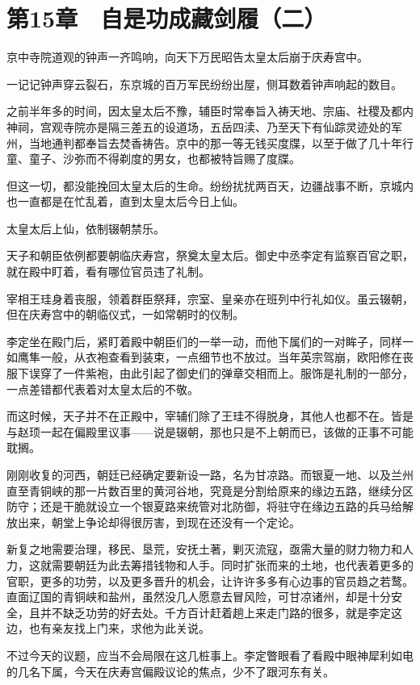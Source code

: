 \section{第15章　自是功成藏剑履（二）}

京中寺院道观的钟声一齐鸣响，向天下万民昭告太皇太后崩于庆寿宫中。

一记记钟声穿云裂石，东京城的百万军民纷纷出屋，侧耳数着钟声响起的数目。

之前半年多的时间，因太皇太后不豫，辅臣时常奉旨入祷天地、宗庙、社稷及都内神祠，宫观寺院亦是隔三差五的设道场，五岳四渎、乃至天下有仙踪灵迹处的军州，当地通判都奉旨去焚香祷告。京中的那一等无钱买度牒，以至于做了几十年行童、童子、沙弥而不得剃度的男女，也都被特旨赐了度牒。

但这一切，都没能挽回太皇太后的生命。纷纷扰扰两百天，边疆战事不断，京城内也一直都是在忙乱着，直到太皇太后今日上仙。

太皇太后上仙，依制辍朝禁乐。

天子和朝臣依例都要朝临庆寿宫，祭奠太皇太后。御史中丞李定有监察百官之职，就在殿中盯着，看有哪位官员违了礼制。

宰相王珪身着丧服，领着群臣祭拜，宗室、皇亲亦在班列中行礼如仪。虽云辍朝，但在庆寿宫中的朝临仪式，一如常朝时的仪制。

李定坐在殿门后，紧盯着殿中朝臣们的一举一动，而他下属们的一对眸子，同样一如鹰隼一般，从衣袍查看到装束，一点细节也不放过。当年英宗驾崩，欧阳修在丧服下误穿了一件紫袍，由此引起了御史们的弹章交相而上。服饰是礼制的一部分，一点差错都代表着对太皇太后的不敬。

而这时候，天子并不在正殿中，宰辅们除了王珪不得脱身，其他人也都不在。皆是与赵顼一起在偏殿里议事——说是辍朝，那也只是不上朝而已，该做的正事不可能耽搁。

刚刚收复的河西，朝廷已经确定要新设一路，名为甘凉路。而银夏一地、以及兰州直至青铜峡的那一片数百里的黄河谷地，究竟是分割给原来的缘边五路，继续分区防守；还是干脆就设立一个银夏路来统管对北防御，将驻守在缘边五路的兵马给解放出来，朝堂上争论却得很厉害，到现在还没有一个定论。

新复之地需要治理，移民、垦荒，安抚土著，剿灭流寇，亟需大量的财力物力和人力，这就需要朝廷为此去筹措钱物和人手。同时扩张而来的土地，也代表着更多的官职，更多的功劳，以及更多晋升的机会，让许许多多有心边事的官员趋之若鹜。直面辽国的青铜峡和盐州，虽然没几人愿意去冒风险，可甘凉诸州，却是十分安全，且并不缺乏功劳的好去处。千方百计赶着趟上来走门路的很多，就是李定这边，也有亲友找上门来，求他为此关说。

不过今天的议题，应当不会局限在这几桩事上。李定瞥眼看了看殿中眼神犀利如电的几名下属，今天在庆寿宫偏殿议论的焦点，少不了跟河东有关。


